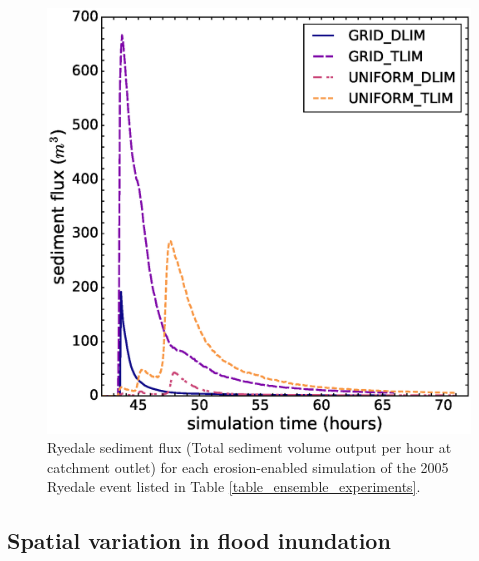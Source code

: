 \begin{figure}[t]
\includegraphics[width=14cm]{chp06_figures_scripts/figure_ryedale_sedigraph_ensemble.eps}
\caption{Ryedale sediment flux (Total sediment volume output per hour at catchment outlet) for each erosion-enabled simulation of the 2005 Ryedale event listed in Table \ref{table_ensemble_experiments}.}
\label{fig_ryedale_sedigraph_ensemble}
\end{figure}

\subsection{Spatial variation in flood inundation}
